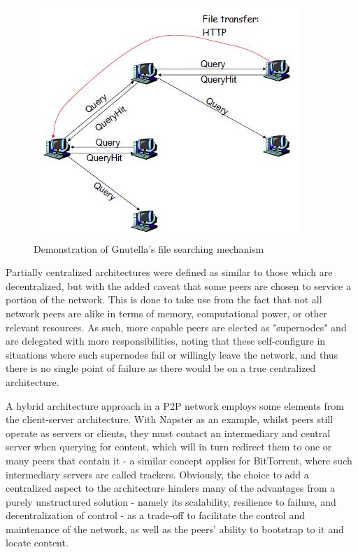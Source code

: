 
\begin{figure}[!h]
\centering
\includegraphics[scale=0.5]{img/gnutella-flood.png}
\caption{Demonstration of Gnutella's file searching mechanism \cite{p2p-survey-1}}
\label{fig:gnutella-flood}
\end{figure}

    Partially centralized architectures were defined as similar to those which are decentralized, but with the added caveat that some peers are chosen to service a portion of the network.
    This is done to take use from the fact that not all network peers are alike in terms of memory, computational power, or other relevant resources.
    As such, more capable peers are elected as "supernodes" and are delegated with more responsibilities, noting that these self-configure in situations where such supernodes fail or willingly leave the network, and thus there is no single point of failure as there would be on a true centralized architecture.

    A hybrid architecture approach in a P2P network employs some elements from the client-server architecture.
    With Napster as an example, whilst peers still operate as servers or clients, they must contact an intermediary and central server when querying for content, which will in turn redirect them to one or many peers that contain it - a similar concept applies for BitTorrent, where such intermediary servers are called trackers.
    Obviously, the choice to add a centralized aspect to the architecture hinders many of the advantages from a purely unstructured solution - namely its scalability, resilience to failure, and decentralization of control - as a trade-off to facilitate the control and maintenance of the network, as well as the peers' ability to bootstrap to it and locate content.

